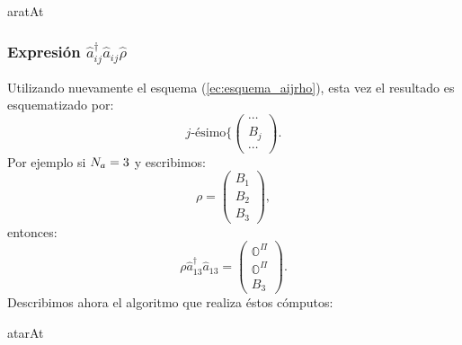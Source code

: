 \begin{algorithm}[H]
\caption{aratAt}\label{algo:aratAt}
\LinesNumbered
{}
\end{algorithm}
\subsubsection*{Expresi\'on $\hat{a}_{ij}^{\dag}\hat{a}_{ij}\hat{\rho}$} Utilizando nuevamente el esquema (\ref{ec:esquema_aijrho}), esta vez el resultado es esquematizado por:
$$\mbox{$j$-\'esimo}\{\left(
\begin{array}{c}
 \cdots\\
B_j\\
\cdots
\end{array}
\right).
$$
Por ejemplo si $N_a=3$ y escribimos:
$$\rho=\left(\begin{array}{ccc}              
B_1\\
B_2\\
B_3
\end{array}\right),
$$
entonces:
$$\rho\hat{a}^{\dag}_{13}\hat{a}_{13}=\left(\begin{array}{ccc}              
\mathbb{O}^\Pi\\
\mathbb{O}^\Pi\\
B_{3}
             \end{array}\right).
$$
\quad Describimos ahora el algoritmo que realiza \'estos c\'omputos:

\begin{algorithm}[H]
\caption{atarAt}\label{algo:atarAt}
\LinesNumbered
{}
\end{algorithm}
